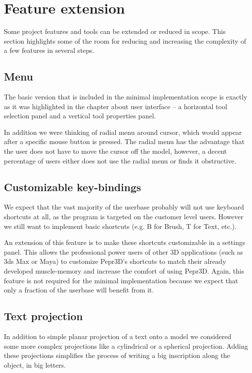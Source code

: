 \section{Feature extension}

Some project features and tools can be extended or reduced in scope. This section highlights some of the room for reducing and increasing the complexity of a few features in several steps.


\subsection{Menu}

The basic version that is included in the minimal implementation scope is exactly as it was highlighted in the chapter about user interface -- a horizontal tool selection panel and a vertical tool properties panel.

In addition we were thinking of radial menu around cursor, which would appear after a specific mouse button is pressed. The radial menu has the advantage that the user does not have to move the cursor off the model, however, a decent percentage of users either does not use the radial menu or finds it obstructive.

\subsection{Customizable key-bindings}
We expect that the vast majority of the userbase probably will not use keyboard shortcuts at all, as the program is targeted on the customer level users. However we still want to implement basic shortcuts (e.g. B for Brush, T for Text, etc.).

An extension of this feature is to make these shortcuts customizable in a settings panel. This allows the professional power users of other 3D applications (such as 3ds Max or Maya) to customize Pepr3D's shortcuts to match their already developed muscle-memory and increase the comfort of using Pepr3D. Again, this feature is not required for the minimal implementation because we expect that only a fraction of the userbase will benefit from it.


\subsection{Text projection}

In addition to simple planar projection of a text onto a model we considered some more complex projections like a cylindrical or a spherical projection. Adding these projections simplifies the process of writing a big inscription along the object, in big letters.

